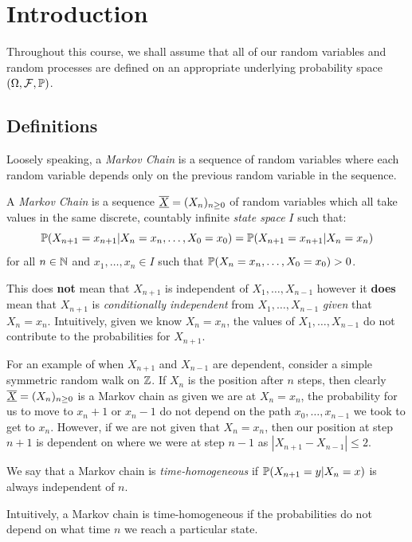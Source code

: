 \documentclass[../main.tex]{subfiles}
\begin{document}
\chapter{Introduction}
\begin{remark}[Note]
  Throughout this course, we shall assume that all of our random variables and random processes are defined on an appropriate underlying probability space $(\Omega, \mathcal{F}, \P)$.
\end{remark}
\section{Definitions}
Loosely speaking, a \textit{Markov Chain} is a sequence of random variables where each random variable depends only on the previous random variable in the sequence.
\begin{definition}
  A \textit{Markov Chain} is a sequence $\mchain{X} = (X_n)_{n \geq 0}$ of random variables which all take values in the same discrete, countably infinite \textit{state space} $I$ such that: \label{mChainDef}
  \[
    \P(X_{n + 1} = x_{n + 1} \vert X_n = x_n, \ldots, X_0 = x_0) = \P(X_{n + 1} = x_{n + 1} \vert X_n = x_n)
  \]
  for all $n \in \N$ and $x_1, \ldots, x_n \in I$ such that $\P(X_n = x_n, \ldots, X_0 = x_0) > 0$.
\end{definition}
\begin{remark}[Note]
  This does \textbf{not} mean that $X_{n + 1}$ is independent of $X_1, \ldots, X_{n - 1}$ however it \textbf{does} mean that $X_{n + 1}$ is \textit{conditionally independent} from $X_1, \ldots, X_{n - 1}$ \textit{given} that $X_n = x_n$.
  Intuitively, given we know $X_n = x_n$, the values of $X_1, \ldots, X_{n - 1}$ do not contribute to the probabilities for $X_{n + 1}$.

  For an example of when $X_{n + 1}$ and $X_{n - 1}$ are dependent, consider a simple symmetric random walk on $\Z$.
  If $X_n$ is the position after $n$ steps, then clearly $\mchain{X} = (X_n)_{n \geq 0}$ is a Markov chain as given we are at $X_n = x_n$, the probability for us to move to $x_n + 1$ or $x_n - 1$ do not depend on the path $x_0, \ldots, x_{n - 1}$ we took to get to $x_n$.
  However, if we are not given that $X_n = x_n$, then our position at step $n + 1$ is dependent on where we were at step $n - 1$ as $|X_{n + 1} - X_{n - 1}| \leq 2$.
\end{remark}
\begin{definition}
  We say that a Markov chain is \textit{time-homogeneous} if $\P(X_{n + 1} = y \vert X_n = x)$ is always independent of $n$.
\end{definition}
Intuitively, a Markov chain is time-homogeneous if the probabilities do not depend on what time $n$ we reach a particular state.
\end{document}
